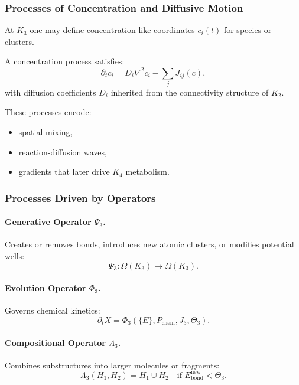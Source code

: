 \subsubsection{Processes of Concentration and Diffusive Motion}

At $K_3$ one may define concentration-like coordinates $c_i(t)$ for 
species or clusters.

A concentration process satisfies:
\[
\partial_t c_i = D_i \nabla^2 c_i - \sum_j J_{ij}(c),
\]
with diffusion coefficients $D_i$ inherited from the connectivity 
structure of $K_2$.

These processes encode:
\begin{itemize}
    \item spatial mixing,
    \item reaction-diffusion waves,
    \item gradients that later drive $K_4$ metabolism.
\end{itemize}

\subsubsection{Processes Driven by Operators}

\paragraph{Generative Operator \texorpdfstring{$\Psi_3$}{\Psi_3}.}
Creates or removes bonds, introduces new atomic clusters, or modifies 
potential wells:
\[
\Psi_3 : \Omega(K_3) \to \Omega(K_3).
\]

\paragraph{Evolution Operator \texorpdfstring{$\Phi_3$}{\Phi_3}.}
Governs chemical kinetics:
\[
\partial_t X = \Phi_3(\{E\}, P_\text{chem}, J_3, \Theta_3).
\]

\paragraph{Compositional Operator \texorpdfstring{$\Lambda_3$}{\Lambda_3}.}
Combines substructures into larger molecules or fragments:
\[
\Lambda_3(H_1, H_2) = H_1 \cup H_2 \quad 
\text{if } E_{\text{bond}}^{\text{new}} < \Theta_3.
\]

